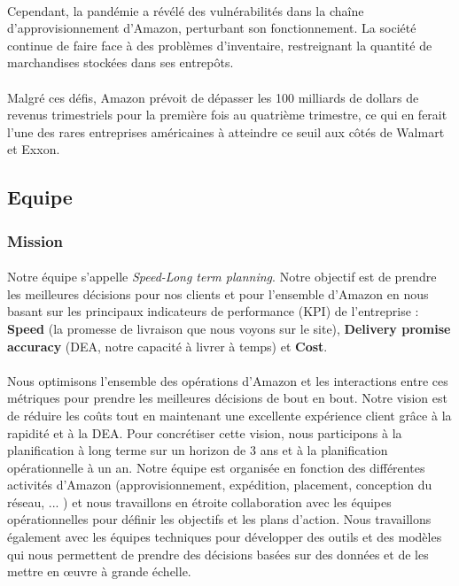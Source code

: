 \paragraph{}
\vspace{-2em}  %
Cependant, la pandémie a révélé des vulnérabilités dans la chaîne d'approvisionnement d'Amazon, perturbant son fonctionnement. La société continue de faire face à des problèmes d'inventaire, restreignant la quantité de marchandises stockées dans ses entrepôts.

\paragraph{}
\vspace{-2em}  %
Malgré ces défis, Amazon prévoit de dépasser les 100 milliards de dollars de revenus trimestriels pour la première fois au quatrième trimestre, ce qui en ferait l'une des rares entreprises américaines à atteindre ce seuil aux côtés de Walmart et Exxon.

\subsection{Equipe}
\subsubsection{Mission}
\paragraph{}
\vspace{-2em}  %
Notre équipe s'appelle \textit{Speed-Long term planning}. 
Notre objectif est de prendre les meilleures décisions pour nos clients et pour l'ensemble d'Amazon en nous basant sur les principaux indicateurs de performance (KPI) de l'entreprise : \textbf{Speed} (la promesse de livraison que nous voyons sur le site), \textbf{Delivery promise accuracy} (DEA, notre capacité à livrer à temps) et \textbf{Cost}. 
\paragraph{}
\vspace{-2em}  %
Nous optimisons l'ensemble des opérations d'Amazon et les interactions entre ces métriques pour prendre les meilleures décisions de bout en bout. Notre vision est de réduire les coûts tout en maintenant une excellente expérience client grâce à la rapidité et à la DEA. Pour concrétiser cette vision, nous participons à la planification à long terme sur un horizon de 3 ans et à la planification opérationnelle à un an. Notre équipe est organisée en fonction des différentes activités d'Amazon (approvisionnement, expédition, placement, conception du réseau, ... ) et nous travaillons en étroite collaboration avec les équipes opérationnelles pour définir les objectifs et les plans d'action. Nous travaillons également avec les équipes techniques pour développer des outils et des modèles qui nous permettent de prendre des décisions basées sur des données et de les mettre en œuvre à grande échelle.
